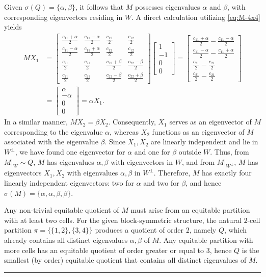 \documentclass[12pt,twoside]{article}
\renewenvironment{proof}{{\noindent\bfseries Proof.}}{\qed}
\def\qed{\nolinebreak\hfill\rule{.2cm}{.2cm}\par\addvspace{.5cm}}
\begin{document}
\begin{proof}
$$	$$
	Given $\sigma(Q)=\{\alpha,\beta\}$, it follows that $M$ possesses eigenvalues $\alpha$ and $\beta$, with corresponding eigenvectors residing in $W$. A direct calculation utilizing \eqref{eq:M-4x4} yields
	\begin{align*}
		M X_1
		&=
		\begin{bmatrix}
			\frac{c_{11}+\alpha}{2} & \frac{c_{11}-\alpha}{2} & \frac{c_{12}}{2} & \frac{c_{12}}{2}\\
			\frac{c_{11}-\alpha}{2} & \frac{c_{11}+\alpha}{2} & \frac{c_{12}}{2} & \frac{c_{12}}{2}\\
			\frac{c_{21}}{2} & \frac{c_{21}}{2} & \frac{c_{22}+\beta}{2} & \frac{c_{22}-\beta}{2}\\
			\frac{c_{21}}{2} & \frac{c_{21}}{2} & \frac{c_{22}-\beta}{2} & \frac{c_{22}+\beta}{2}
		\end{bmatrix}
		\begin{bmatrix}1\\[-1pt]-1\\[-1pt]0\\[-1pt]0\end{bmatrix}=
		\begin{bmatrix}
			\frac{c_{11}+\alpha}{2} - \frac{c_{11}-\alpha}{2}\\
			\frac{c_{11}-\alpha}{2} - \frac{c_{11}+\alpha}{2}\\
			\frac{c_{21}}{2} - \frac{c_{21}}{2}\\
			\frac{c_{21}}{2} - \frac{c_{21}}{2}
		\end{bmatrix}\\
		&=
		\begin{bmatrix}
			\alpha\\-\alpha\\ 0\\0
		\end{bmatrix}
		= \alpha X_1.
	\end{align*}
	In a similar manner, $M X_2 = \beta X_2.$ Consequently, $X_1$ serves as an eigenvector of $M$ corresponding to the eigenvalue $\alpha$, whereas $X_2$ functions as an eigenvector of $M$ associated with the eigenvalue $\beta$. Since $X_1,X_2$ are linearly
	independent and lie in $W^\perp$, we have found one eigenvector for $\alpha$
	and one for $\beta$ outside $W$. Thus,  from $M|_W\sim Q$, $M$ has eigenvalues $\alpha,\beta$ with eigenvectors
		in $W$, and  from $M|_{W^\perp}$, $M$ has eigenvectors $X_1,X_2$ with eigenvalues
		$\alpha,\beta$ in $W^\perp$. 	Therefore, $M$ has exactly four linearly independent eigenvectors:
	two for $\alpha$ and two for $\beta$, and hence  $\sigma(M)=\{\alpha,\alpha,\beta,\beta\}.$ 
	
	Any non-trivial equitable quotient of $M$ must arise from an equitable
	partition with at least two cells. For the given block-symmetric structure, the
	natural $2$-cell partition $\pi=\{\{1,2\},\{3,4\}\}$ produces a quotient of
	order $2$, namely $Q$, which already contains all distinct eigenvalues
	$\alpha,\beta$ of $M$. Any equitable partition with more cells has an equitable
	quotient of order greater or equal to $ 3$, hence $Q$ is the smallest (by order) equitable
	quotient that contains all distinct eigenvalues of $M$.
\end{proof}
\end{document}
